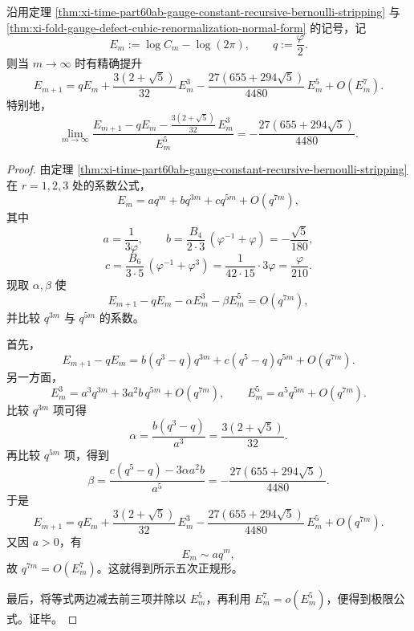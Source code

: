 \begin{theorem}\label{thm:xi-time-part64a-fold-gauge-quintic-renormalization-normal-form}
沿用定理 \ref{thm:xi-time-part60ab-gauge-constant-recursive-bernoulli-stripping} 与
\ref{thm:xi-fold-gauge-defect-cubic-renormalization-normal-form} 的记号，记
\[
E_m:=\log C_m-\log(2\pi),
\qquad
q:=\frac{\varphi}{2}.
\]
则当 \(m\to\infty\) 时有精确提升
\[
E_{m+1}
=
qE_m
+\frac{3(2+\sqrt5)}{32}\,E_m^3
-\frac{27(655+294\sqrt5)}{4480}\,E_m^5
+O(E_m^7).
\]
特别地，
\[
\lim_{m\to\infty}
\frac{
E_{m+1}
-qE_m
-\frac{3(2+\sqrt5)}{32}\,E_m^3
}{
E_m^5
}
=
-\frac{27(655+294\sqrt5)}{4480}.
\]
\end{theorem}
\begin{proof}
由定理 \ref{thm:xi-time-part60ab-gauge-constant-recursive-bernoulli-stripping} 在 \(r=1,2,3\) 处的系数公式，
\[
E_m
=
aq^m+bq^{3m}+cq^{5m}+O(q^{7m}),
\]
其中
\[
a=\frac{1}{3\varphi},
\qquad
b=
\frac{B_4}{2\cdot 3}\,(\varphi^{-1}+\varphi)
=
-\frac{\sqrt5}{180},
\]
\[
c=
\frac{B_6}{3\cdot 5}\,(\varphi^{-1}+\varphi^3)
=
\frac{1}{42\cdot 15}\cdot 3\varphi
=
\frac{\varphi}{210}.
\]
现取 \(\alpha,\beta\) 使
\[
E_{m+1}-qE_m-\alpha E_m^3-\beta E_m^5=O(q^{7m}),
\]
并比较 \(q^{3m}\) 与 \(q^{5m}\) 的系数。

首先，
\[
E_{m+1}-qE_m
=
b(q^3-q)q^{3m}+c(q^5-q)q^{5m}+O(q^{7m}).
\]
另一方面，
\[
E_m^3=a^3q^{3m}+3a^2b\,q^{5m}+O(q^{7m}),
\qquad
E_m^5=a^5q^{5m}+O(q^{7m}).
\]
比较 \(q^{3m}\) 项可得
\[
\alpha=\frac{b(q^3-q)}{a^3}
=
\frac{3(2+\sqrt5)}{32}.
\]
再比较 \(q^{5m}\) 项，得到
\[
\beta
=
\frac{c(q^5-q)-3\alpha a^2b}{a^5}
=
-\frac{27(655+294\sqrt5)}{4480}.
\]
于是
\[
E_{m+1}
=
qE_m
+\frac{3(2+\sqrt5)}{32}\,E_m^3
-\frac{27(655+294\sqrt5)}{4480}\,E_m^5
+O(q^{7m}).
\]
又因 \(a>0\)，有
\[
E_m\sim aq^m,
\]
故 \(q^{7m}=O(E_m^7)\)。这就得到所示五次正规形。

最后，将等式两边减去前三项并除以 \(E_m^5\)，再利用 \(E_m^7= o(E_m^5)\)，便得到极限公式。证毕。
\end{proof}

